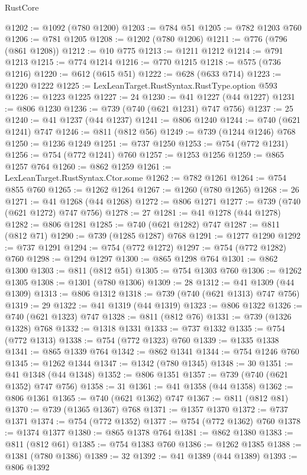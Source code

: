 \begin{lexlean}{RustCore}
\begin{coremodule}
@1202 := @1092 (@780 @1200)
@1203 := @784 @51
@1205 := @782 @1203 @760
@1206 := @781 @1205
@1208 := @1202 (@780 @1206)
@1211 := @776 (@796 (@861 @1208))
@1212 := @10 @775
@1213 := @1211 @1212
@1214 := @791 @1213
@1215 := @774 @1214
@1216 := @770 @1215
@1218 := @575 (@736 @1216)
@1220 := @612 (@615 @51)
@1222 := @628 (@633 @714)
@1223 := @1220 @1222
@1225 := LexLeanTarget.RustSyntax.RustType.option @593
@1226 := @1223 @1225
@1227 := 24
@1230 := @41 @1227 (@44 @1227)
@1231 := @806 @1230
@1236 := @739 (@740 (@621 @1231) @747 @756)
@1237 := 25
@1240 := @41 @1237 (@44 @1237)
@1241 := @806 @1240
@1244 := @740 (@621 @1241) @747
@1246 := @811 (@812 @56)
@1249 := @739 (@1244 @1246) @768
@1250 := @1236 @1249
@1251 := @737 @1250
@1253 := @754 (@772 @1231)
@1256 := @754 (@772 @1241) @760
@1257 := @1253 @1256
@1259 := @865 @1257 @764
@1260 := @862 @1259
@1261 := LexLeanTarget.RustSyntax.Ctor.some
@1262 := @782 @1261
@1264 := @754 @855 @760
@1265 := @1262 @1264
@1267 := @1260 (@780 @1265)
@1268 := 26
@1271 := @41 @1268 (@44 @1268)
@1272 := @806 @1271
@1277 := @739 (@740 (@621 @1272) @747 @756)
@1278 := 27
@1281 := @41 @1278 (@44 @1278)
@1282 := @806 @1281
@1285 := @740 (@621 @1282) @747
@1287 := @811 (@812 @71)
@1290 := @739 (@1285 @1287) @768
@1291 := @1277 @1290
@1292 := @737 @1291
@1294 := @754 (@772 @1272)
@1297 := @754 (@772 @1282) @760
@1298 := @1294 @1297
@1300 := @865 @1298 @764
@1301 := @862 @1300
@1303 := @811 (@812 @51)
@1305 := @754 @1303 @760
@1306 := @1262 @1305
@1308 := @1301 (@780 @1306)
@1309 := 28
@1312 := @41 @1309 (@44 @1309)
@1313 := @806 @1312
@1318 := @739 (@740 (@621 @1313) @747 @756)
@1319 := 29
@1322 := @41 @1319 (@44 @1319)
@1323 := @806 @1322
@1326 := @740 (@621 @1323) @747
@1328 := @811 (@812 @76)
@1331 := @739 (@1326 @1328) @768
@1332 := @1318 @1331
@1333 := @737 @1332
@1335 := @754 (@772 @1313)
@1338 := @754 (@772 @1323) @760
@1339 := @1335 @1338
@1341 := @865 @1339 @764
@1342 := @862 @1341
@1344 := @754 @1246 @760
@1345 := @1262 @1344
@1347 := @1342 (@780 @1345)
@1348 := 30
@1351 := @41 @1348 (@44 @1348)
@1352 := @806 @1351
@1357 := @739 (@740 (@621 @1352) @747 @756)
@1358 := 31
@1361 := @41 @1358 (@44 @1358)
@1362 := @806 @1361
@1365 := @740 (@621 @1362) @747
@1367 := @811 (@812 @81)
@1370 := @739 (@1365 @1367) @768
@1371 := @1357 @1370
@1372 := @737 @1371
@1374 := @754 (@772 @1352)
@1377 := @754 (@772 @1362) @760
@1378 := @1374 @1377
@1380 := @865 @1378 @764
@1381 := @862 @1380
@1383 := @811 (@812 @61)
@1385 := @754 @1383 @760
@1386 := @1262 @1385
@1388 := @1381 (@780 @1386)
@1389 := 32
@1392 := @41 @1389 (@44 @1389)
@1393 := @806 @1392

\end{coremodule}
\end{lexlean}
